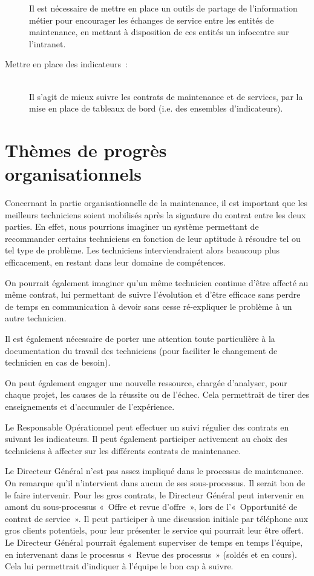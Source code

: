 \begin{description}
    Il est nécessaire de mettre en place un outils de partage de l'information métier pour encourager les échanges de service entre les entités de maintenance, en mettant à disposition de ces entités un info­centre sur l’intranet.

    \item [Mettre en place des indicateurs~:] ~ \\

    Il s'agit de mieux suivre les contrats de maintenance et de services, par la mise en place de tableaux de bord (i.e. des ensembles d’indicateurs).

\end{description}

\section{Thèmes de progrès organisationnels}

Concernant la partie organisationnelle de la maintenance, il est important que les meilleurs techniciens soient mobilisés après la signature du contrat entre les deux parties. En effet, nous pourrions imaginer un système permettant de recommander certains techniciens en fonction de leur aptitude à résoudre tel ou tel type de problème. Les techniciens interviendraient alors beaucoup plus efficacement, en restant dans leur domaine de compétences.

On pourrait également imaginer qu'un même technicien continue d'être affecté au même contrat, lui permettant de suivre l'évolution et d'être efficace sans perdre de temps en communication à devoir sans cesse ré-expliquer le problème à un autre technicien.

Il est également nécessaire de porter une attention toute particulière à la documentation du travail des techniciens (pour faciliter le changement de technicien en cas de besoin).

On peut également engager une nouvelle ressource, chargée d'analyser, pour chaque projet, les causes de la réussite ou de l'échec. Cela permettrait de tirer des enseignements et d'accumuler de l'expérience.

Le Responsable Opérationnel peut effectuer un suivi régulier des contrats en suivant les indicateurs. Il peut également participer activement au choix des techniciens à affecter sur les différents contrats de maintenance.

Le Directeur Général n'est pas assez impliqué dans le processus de maintenance. On remarque qu'il n'intervient dans aucun de ses sous-processus. Il serait bon de le faire intervenir.
Pour les gros contrats, le Directeur Général peut intervenir en amont du sous-processus «~Offre et revue d'offre~», lors de l'«~Opportunité de contrat de service~». Il peut participer à une discussion initiale par téléphone aux gros clients potentiels, pour leur présenter le service qui pourrait leur être offert.
Le Directeur Général pourrait également superviser de temps en temps l'équipe, en intervenant dans le processus «~Revue des processus~» (soldés et en cours). Cela lui permettrait d'indiquer à l'équipe le bon cap à suivre.


